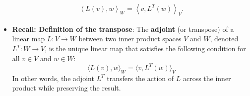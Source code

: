 \documentclass{report}
\begin{document}
\begin{itemize}
            \begin{align*}
                \left\langle L(v), w \right\rangle_{W} = \left\langle v, L^{T}(w) \right\rangle_{V}
            .\end{align*}
        \item \textbf{Recall: Definition of the transpose}: The \textbf{adjoint} (or transpose) of a linear map \( L: V \to W \) between two inner product spaces \( V \) and \( W \), denoted \( L^T: W \to V \), is the unique linear map that satisfies the following condition for all \( v \in V \) and \( w \in W \):
            \[
                \langle L(v), w \rangle_W = \langle v, L^T(w) \rangle_V
            \]
            In other words, the adjoint \( L^T \) transfers the action of \( L \) across the inner product while preserving the result.


\end{itemize}
\end{document}
